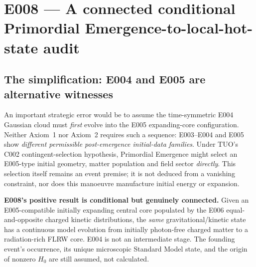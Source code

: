 \documentclass[11pt,a4paper]{article}
\theoremstyle{tmon}
\theoremstyle{definition}
\begin{document}
\clearpage
\section{E008 --- A connected conditional Primordial Emergence-to-local-hot-state audit}\label{sec:e008}
\subsection{The simplification: E004 and E005 are alternative witnesses}
An important strategic error would be to assume the time-symmetric E004 Gaussian cloud must \emph{first} evolve into the E005 expanding-core configuration. Neither Axiom~1 nor Axiom~2 requires such a sequence: E003--E004 and E005 show \emph{different permissible post-emergence initial-data families}. Under TUO's C002 contingent-selection hypothesis, Primordial Emergence might select an E005-type initial geometry, matter population and field sector \emph{directly}. This selection itself remains an event premise; it is not deduced from a vanishing constraint, nor does this manoeuvre manufacture initial energy or expansion.

\begin{keybox}
\textbf{E008's positive result is conditional but genuinely connected.} Given an E005-compatible initially expanding central core populated by the E006 equal-and-opposite charged kinetic distributions, the \emph{same} gravitational/kinetic state has a continuous model evolution from initially photon-free charged matter to a radiation-rich FLRW core. E004 is not an intermediate stage. The founding event's occurrence, its unique microscopic Standard Model state, and the origin of nonzero $H_0$ are still assumed, not calculated.
\end{keybox}
\end{document}
